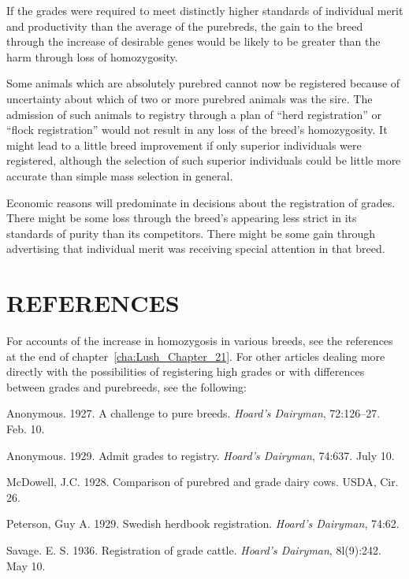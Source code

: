 If the grades were required to meet distinctly higher standards of
individual merit and productivity than the average of the purebreds,
the gain to the breed through the increase of desirable genes would be
likely to be greater than the harm through loss of homozygosity.

Some animals which are absolutely purebred cannot now be registered
because of uncertainty about which of two or more purebred animals
was the sire. The admission of such animals to registry through a
plan of ``herd registration'' or ``flock registration'' would not result in
any loss of the breed's homozygosity. It might lead to a little breed
improvement if only superior individuals were registered, although the
selection of such superior individuals could be little more accurate than
simple mass selection in general.

Economic reasons will predominate in decisions about the registration
of grades. There might be some loss through the breed's appearing
less strict in its standards of purity than its competitors. There might
be some gain through advertising that individual merit was receiving
special attention in that breed.

\section*{REFERENCES}

For accounts of the increase in homozygosis in various breeds, see
the references at the end of chapter~\ref{cha:Lush_Chapter_21}. For
other articles dealing more directly with the possibilities of
registering high grades or with differences between grades and
purebreeds, see the following:

\begin{hangparas}{0.5in}{1}%
Anonymous. 1927. A challenge to pure breeds. \textit{Hoard's Dairyman},
72:126--27. Feb. 10.

Anonymous. 1929. Admit grades to registry. \textit{Hoard's Dairyman},
74:637. July 10.

McDowell, J.C. 1928. Comparison of purebred and grade dairy cows. USDA,
Cir. 26.

Peterson, Guy A. 1929. Swedish herdbook registration. \textit{Hoard's
Dairyman}, 74:62.

Savage. E. S. 1936. Registration of grade cattle. \textit{Hoard's Dairyman},
8l(9):242. May 10.
\end{hangparas}